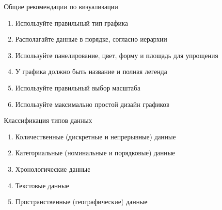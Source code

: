 \documentclass[xcolor=dvipsnames, 12pt]{beamer}
\begin{document}
\begin{frame}{Общие рекомендации по визуализации}

\begin{enumerate}

\item Используйте правильный \alert{тип графика}

\vskip0.2cm

\item Располагайте данные в \alert{порядке}, согласно иерархии

\vskip0.2cm

\item Используйте \alert{панелирование}, цвет, форму и площадь для упрощения

\vskip0.2cm

\item У графика должно быть \alert{название} и полная \alert{легенда}

\vskip0.2cm

\item Используйте правильный выбор \alert{масштаба}

\vskip0.2cm

\item Используйте максимально \alert{простой} дизайн графиков

\end{enumerate}

\end{frame}

\begin{frame}{Классификация типов данных}

\begin{enumerate}

\item \alert{Количественные} (дискретные и непрерывные) данные

\vskip0.2cm

\item \alert{Категориальные} (номинальные и порядковые) данные

\vskip0.2cm

\item \alert{Хронологические} данные

\vskip0.2cm

\item \alert{Текстовые} данные

\vskip0.2cm

\item \alert{Пространственные} (географические) данные

\end{enumerate}

\end{frame}
\end{document}
